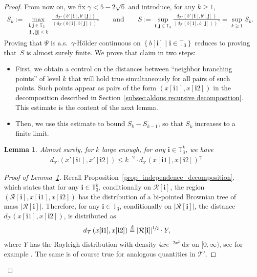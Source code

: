 \documentclass[JEP,XML,SOM,Unicode,NoFloatCountersInSection,published]{cedram}
\newcommand{\enstq}[2]{\left\lbrace#1\mathrel{}\middle|\mathrel{}#2\right\rbrace}
\newcommand{\intervalle}[4]{\mathopen{#1}#2\mathclose{}\mathpunct{},#3\mathclose{#4}}
\newcommand{\intervallefo}[2]{\intervalle{[}{#1}{#2}{)}}
\newcommand{\Tt}{\mathcal{T}}
\newcommand{\ii}{\mathbf{i}}
\newcommand{\jj}{\mathbf{j}}
\theoremstyle{plain}
\newtheorem{lemma}[theorem]{Lemma}
\theoremstyle{definition}
\begin{document}
\begin{proof}
From now on, we fix $\gamma < 5-2\sqrt{6}$ and introduce, for any $k\geq 1$,
\begin{align*}
S_k := \max_{\substack{\ii, \jj\in \mathbb{T}_3 \\ |\ii|, |\jj| \leq k}} \frac{d_{\Tt'}(b'[\ii],b'[\jj])}{ \left(d_{\Tt}(b[\ii],b[\jj])\right)^\gamma} \qquad \text{and} \qquad S := \sup_{\ii, \jj\in \mathbb{T}_3} \frac{d_{\Tt'}(b'[\ii],b'[\jj])}{ \left(d_{\Tt}(b[\ii],b[\jj])\right)^\gamma}= \sup_{k\geq 1} S_k.
\end{align*}
Proving that $\Psi$ is a.s.\ $\gamma$-Hölder continuous on $\enstq{b[\ii]}{ \ii\in \mathbb T_3}$ reduces to proving that~$S$ is almost surely finite.
We prove that claim in two steps:
\begin{itemize}
\item First, we obtain a control on the distances between ``neighbor branching points'' of level $k$ that will hold true simultaneously for all pairs of such points.
Such points appear as pairs of the form $(x[\ii1], x[\ii2])$ in the decomposition described in Section~\ref{subsec:aldous recursive decomposition}.
This estimate is the content of the next lemma.
\item Then, we use this estimate to bound $S_k-S_{k-1}$, so that $S_k$ increases to a finite limit.
\end{itemize}
\begin{lemma}\label{lem:distance neighbouring points}
Almost surely, for $k$ large enough, for any $\ii\in \mathbb{T}_3^k$, we have\vspace*{-3pt}
\begin{align}\label{eq:distance estimate for neighbouring points}
d_{\Tt'} \left( x'[\ii1],x'[\ii2] \right) \leq k^{-2}\cdot d_{\Tt}( x[\ii1],x[\ii2])^\gamma.
\end{align}
\end{lemma}
\begin{proof}[Proof of Lemma~\ref{lem:distance neighbouring points}]
Recall Proposition~\ref{prop_independence_decomposition}, which states that for any $\ii\in \mathbb{T}_3^k$, conditionally on $\mathcal{R}[\ii]$, the region $(\mathcal{R}[\ii], x[\ii1],x[\ii2])$ has the distribution of a bi-pointed Brownian tree of mass $|\mathcal{R}[\ii]|$. Therefore, for any $\ii\in \mathbb{T}_3$, conditionally on $|\mathcal{R}[\ii]|$, the distance $d_{\Tt} \left( x[\ii1],x[\ii2] \right)$, is distributed as\vspace*{-3pt}
\begin{align*}
d_{\Tt} \left( x[\ii1],x[\ii2] \right) \overset{\mathrm{d}}{=}|\mathcal{R}[\ii]|^{\sfrac{1}{2}} \cdot Y,
\end{align*}
where $Y$ has the Rayleigh distribution with density $4xe^{-2x^2}\ \mathrm{d}x$ on $\intervallefo{0}{\infty}$, see for example \cite[Th.\,2.11]{legall_random_2005}.
The same is of course true for analogous quantities in $\Tt'$.


\end{proof}
\end{proof}
\end{document}
